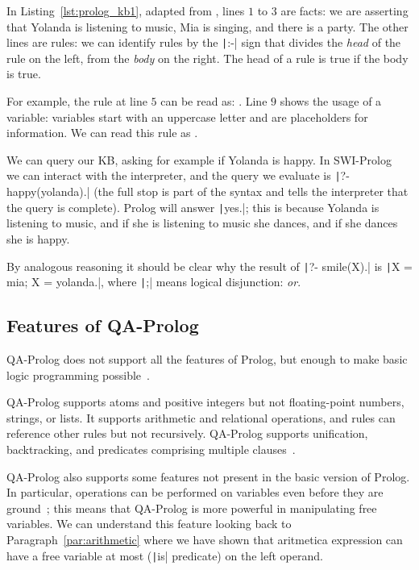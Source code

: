 In Listing~\ref{lst:prolog_kb1}, adapted from \cite{learn_prolog_now_online}, lines $1$ to $3$ are facts: we are asserting that Yolanda is listening to music, Mia is singing, and there is a party. The other lines are rules: we can identify rules by the \texttt|:-| sign that divides the \emph{head} of the rule on the left, from the \emph{body} on the right. The head of a rule is true if the body is true.

For example, the rule at line $5$ can be read as: . Line $9$ shows the usage of a variable: variables start with an uppercase letter and are placeholders for information. We can read this rule as .

We can query our KB, asking for example if Yolanda is happy. In SWI-Prolog~\cite{wielemaker2011tplp} we can interact with the interpreter, and the query we evaluate is \texttt|?- happy(yolanda).| (the full stop is part of the syntax and tells the interpreter that the query is complete). Prolog will answer \texttt|yes.|; this is because Yolanda is listening to music, and if she is listening to music she dances, and if she dances she is happy.

By analogous reasoning it should be clear why the result of \texttt|?- smile(X).| is \texttt|X = mia; X = yolanda.|, where \texttt|;| means logical disjunction: \emph{or}.

\subsection{Features of QA-Prolog}
\label{sec:feature_qa_p}
QA-Prolog does not support all the features of Prolog, but enough to make basic logic programming possible~\cite{pakin2018performing}.

QA-Prolog supports atoms and positive integers but not floating-point numbers, strings, or lists. It supports arithmetic and relational operations, and rules can reference other rules but not recursively. QA-Prolog supports unification, backtracking, and predicates comprising multiple clauses~\cite{pakin2018performing}.

QA-Prolog also supports some features not present in the basic version of Prolog. In particular, operations can be performed on variables even before they are ground~\cite{pakin2018performing}; this means that QA-Prolog is more powerful in manipulating free variables.  We can understand this feature looking back to Paragraph~\ref{par:arithmetic} where we have shown that aritmetica expression can have a free variable at most (\texttt|is| predicate) on the left operand. 

